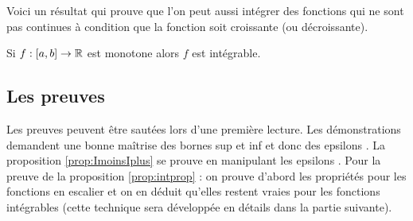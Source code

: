 \documentclass[class=report,crop=false]{standalone}
\begin{document}
\medskip


Voici un résultat qui prouve que l'on peut aussi intégrer des fonctions qui ne sont pas continues
à condition que la fonction soit croissante (ou décroissante).
\begin{theoreme}
\label{th:monotoneintegrable}
Si $f : [a,b] \to \mathbb{R}$ est monotone alors $f$ est intégrable.
\end{theoreme}
%
%

%
%

\subsection{Les preuves}

Les preuves peuvent être sautées lors d'une première lecture.
Les démonstrations demandent une bonne maîtrise des bornes sup et inf
et donc des \og epsilons \fg{}.
La proposition \ref{prop:ImoinsIplus} se prouve en manipulant les \og epsilons \fg{}.
Pour la preuve de la proposition \ref{prop:intprop} : on prouve d'abord les propriétés
pour les fonctions en escalier et on en déduit qu'elles restent vraies pour les fonctions intégrables
(cette technique sera développée en détails dans la partie suivante).
\end{document}
